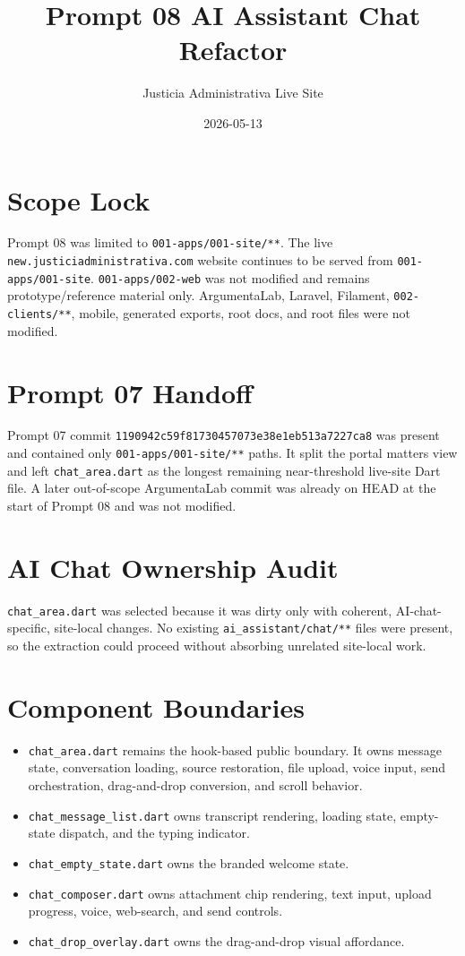 \documentclass[11pt]{article}
\title{Prompt 08 AI Assistant Chat Refactor}
\author{Justicia Administrativa Live Site}
\date{2026-05-13}
\begin{document}
\maketitle

\section*{Scope Lock}
Prompt 08 was limited to \texttt{001-apps/001-site/**}. The live
\texttt{new.justiciadministrativa.com} website continues to be served from
\texttt{001-apps/001-site}. \texttt{001-apps/002-web} was not modified and
remains prototype/reference material only. ArgumentaLab, Laravel, Filament,
\texttt{002-clients/**}, mobile, generated exports, root docs, and root files
were not modified.

\section*{Prompt 07 Handoff}
Prompt 07 commit
\texttt{1190942c59f81730457073e38e1eb513a7227ca8} was present and contained
only \texttt{001-apps/001-site/**} paths. It split the portal matters view and
left \texttt{chat\_area.dart} as the longest remaining near-threshold
live-site Dart file. A later out-of-scope ArgumentaLab commit was already on
HEAD at the start of Prompt 08 and was not modified.

\section*{AI Chat Ownership Audit}
\texttt{chat\_area.dart} was selected because it was dirty only with coherent,
AI-chat-specific, site-local changes. No existing
\texttt{ai\_assistant/chat/**} files were present, so the extraction could
proceed without absorbing unrelated site-local work.

\section*{Component Boundaries}
\begin{itemize}
  \item \texttt{chat\_area.dart} remains the hook-based public boundary. It
  owns message state, conversation loading, source restoration, file upload,
  voice input, send orchestration, drag-and-drop conversion, and scroll
  behavior.
  \item \texttt{chat\_message\_list.dart} owns transcript rendering, loading
  state, empty-state dispatch, and the typing indicator.
  \item \texttt{chat\_empty\_state.dart} owns the branded welcome state.
  \item \texttt{chat\_composer.dart} owns attachment chip rendering, text
  input, upload progress, voice, web-search, and send controls.
  \item \texttt{chat\_drop\_overlay.dart} owns the drag-and-drop visual
  affordance.
\end{itemize}
\end{document}
